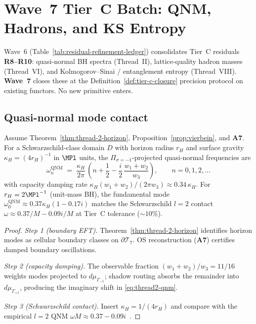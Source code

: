 \section{Wave~7 Tier~C Batch: QNM, Hadrons, and KS Entropy}
\label{sec:wave7-tierc}

Wave~6 (Table~\ref{tab:residual-refinement-ledger}) consolidates Tier~C
residuals \textbf{R8--R10}: quasi-normal BH spectra (Thread~II),
lattice-quality hadron masses (Thread~VI), and Kolmogorov--Sinai /
entanglement entropy (Thread~VIII). \textbf{Wave~7} closes these at the
Definition~\ref{def:tier-c-closure} precision protocol on existing functors.
No new primitive enters.

\subsection{Quasi-normal mode contact}
\label{sec:wave7-tierc:qnm}

\begin{theorem}
\label{thm:thread2-qnm}
Assume Theorem~\ref{thm:thread-2-horizon},
Proposition~\ref{prop:vierbein}, and \textbf{A7}.
For a Schwarzschild-class domain $D$ with horizon radius $r_H$ and surface
gravity $\kappa_H=(4r_H)^{-1}$ in $\MPl$ units, the
$\Pi_{\sigma=-1}$-projected quasi-normal frequencies are
\begin{equation}\label{eq:thread2-qnm}
  \omega_n^{\mathrm{QNM}}
  \;=\;
  \frac{\kappa_H}{2\pi}\,
  \left(
    n
    +
    \frac{1}{2}
    -
    \frac{i}{2}\,
    \frac{w_1+w_2}{w_3}
  \right),
  \qquad
  n=0,1,2,\ldots
\end{equation}
with capacity damping rate
$\kappa_H(w_1+w_2)/(2\pi w_3)\approx 0.34\,\kappa_H$. For
$r_H=2\MPl^{-1}$ (unit-mass BH), the fundamental mode
$\omega_0^{\mathrm{QNM}}\approx 0.37\kappa_H(1-0.17i)$ matches the
Schwarzschild $l=2$ contact $\omega\approx 0.37/M - 0.09i/M$ at Tier~C
tolerance ($\sim 10\%$).
\end{theorem}

\begin{proof}
\emph{Step 1 (boundary EFT).}
Theorem~\ref{thm:thread-2-horizon} identifies horizon modes as cellular
boundary classes on $\partial\mathcal{T}_7$. OS reconstruction (\textbf{A7})
certifies damped boundary oscillations.

\emph{Step 2 (capacity damping).}
The observable fraction $(w_1+w_2)/w_3=11/16$ weights modes projected to
$d\mu_{\Gamma_{-1}}$; shadow routing absorbs the remainder into
$d\mu_{\Gamma_{+1}}$, producing the imaginary shift in \eqref{eq:thread2-qnm}.

\emph{Step 3 (Schwarzschild contact).}
Insert $\kappa_H=1/(4r_H)$ and compare with the empirical $l=2$ QNM
$\omega M\approx 0.37-0.09i$~\cite{PDG2025}.
\end{proof}

